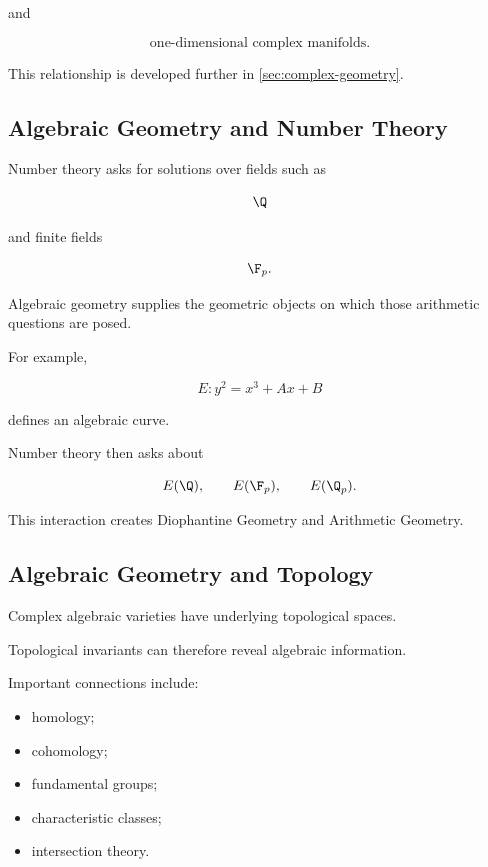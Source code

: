 and

\[
\boxed{
\text{one-dimensional complex manifolds}.
}
\]

This relationship is developed further in
\cref{sec:complex-geometry}.

\subsection{Algebraic Geometry and Number Theory}
\label{subsec:algebraic-geometry-number-theory}

Number theory asks for solutions over fields such as

\[
\Q
\]

and finite fields

\[
\F_p.
\]

Algebraic geometry supplies the geometric objects on which those arithmetic
questions are posed.

For example,

\[
E:y^2=x^3+Ax+B
\]

defines an algebraic curve.

Number theory then asks about

\[
E(\Q),
\qquad
E(\F_p),
\qquad
E(\Q_p).
\]

This interaction creates Diophantine Geometry and Arithmetic Geometry.

\subsection{Algebraic Geometry and Topology}
\label{subsec:algebraic-geometry-topology}

Complex algebraic varieties have underlying topological spaces.

Topological invariants can therefore reveal algebraic information.

Important connections include:

\begin{itemize}
    \item homology;
    \item cohomology;
    \item fundamental groups;
    \item characteristic classes;
    \item intersection theory.
\end{itemize}

